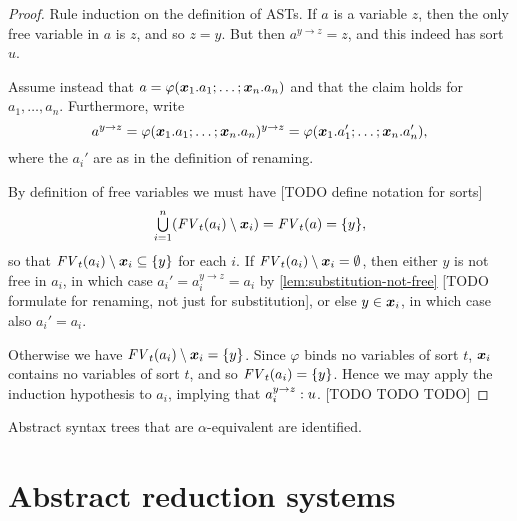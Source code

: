\documentclass[a4paper, 11pt, article, danish, oneside]{memoir}
\DeclarePairedDelimiter{\auxdelimparen}{(}{)}
\DeclareMathOperator*{\smallbigcup}{\textstyle\bigcup}
\DeclareMathOperator*{\bigunion}{\mathchoice
    {\smallbigcup}%
    {\bigcup}%
    {\bigcup}%
    {\bigcup}%
}
\renewcommand{\phi}{\varphi}
\newcommand{\freevarsort}[3][]{\mathit{FV}_{#3}\auxdelimparen[#1]{#2}}
\begin{document}
\begin{proof}
    Rule induction on the definition of ASTs. If $a$ is a variable $z$, then the only free variable in $a$ is $z$, and so $z = y$. But then $a^{y \to z} = z$, and this indeed has sort $u$.

    Assume instead that $a = \phi(\seq{x}_1.a_1 ; \ldots ; \seq{x}_n.a_n)$ and that the claim holds for $a_1, \ldots, a_n$. Furthermore, write
    \begin{equation*}
        a^{y \to z}
            = \phi(\seq{x}_1.a_1 ; \ldots ; \seq{x}_n.a_n)^{y \to z}
            = \phi(\seq{x}_1.a_1' ; \ldots ; \seq{x}_n.a_n'),
    \end{equation*}
    where the $a_i'$ are as in the definition of renaming.
    
    
    
    
    By definition of free variables we must have [TODO define notation for sorts]
    \begin{equation*}
        \bigunion_{i=1}^n (\freevarsort{a_i}{t} \setminus \seq{x}_i)
            = \freevarsort{a}{t}
            = \{y\},
    \end{equation*}
    so that $\freevarsort{a_i}{t} \setminus \seq{x}_i \subseteq \{y\}$ for each $i$. If $\freevarsort{a_i}{t} \setminus \seq{x}_i = \emptyset$, then either $y$ is not free in $a_i$, in which case $a_i' = a_i^{y \to z} = a_i$ by \cref{lem:substitution-not-free} [TODO formulate for renaming, not just for substitution], or else $y \in \bm{x}_i$, in which case also $a_i' = a_i$.

    Otherwise we have $\freevarsort{a_i}{t} \setminus \seq{x}_i = \{y\}$. Since $\phi$ binds no variables of sort $t$, $\bm{x}_i$ contains no variables of sort $t$, and so $\freevarsort{a_i}{t} = \{y\}$. Hence we may apply the induction hypothesis to $a_i$, implying that $a_i^{y \to z} : u$. [TODO TODO TODO]
\end{proof}


\begin{convention}
    Abstract syntax trees that are $\alpha$-equivalent are identified.
\end{convention}


\section{Abstract reduction systems}

\newcommand{\reduce}{\rightarrow}
\newcommand{\reduceR}{\overset{=}{\rightarrow}}
\newcommand{\reduceT}{\overset{+}{\rightarrow}}
\newcommand{\reduceRT}{\overset{*}{\rightarrow}}
\newcommand{\reduceI}{\leftarrow}
\newcommand{\reduceIR}{\overset{=}{\leftarrow}}
\newcommand{\reduceIT}{\overset{+}{\leftarrow}}
\newcommand{\reduceIRT}{\overset{*}{\leftarrow}}
\newcommand{\reduceS}{\leftrightarrow}
\newcommand{\reduceTS}{\overset{+}{\leftrightarrow}}
\newcommand{\reduceRTS}{\overset{*}{\leftrightarrow}}
\newcommand{\joinable}{\downarrow}
\end{document}
